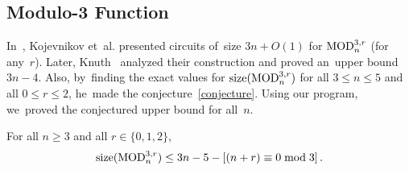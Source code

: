 \subsection{Modulo-3 Function}
In~\cite{DBLP:conf/sat/KojevnikovKY09}, Kojevnikov et~al.
presented circuits of~size $3n+O(1)$ for $\operatorname{MOD}_n^{3,r}$ (for any~$r$). Later,
Knuth~\cite[solution to exercise~$480$]{Knuth:2015:ACP:2898950} analyzed their construction and proved an~upper
bound $3n-4$. Also, by~finding the exact values
for $\operatorname{size}(\operatorname{MOD}_n^{3,r})$ for all $3 \le n \le 5$ and all $0 \le r \le 2$, he~made the conjecture~\eqref{conjecture}.
Using our program, we~proved the conjectured upper bound for all~$n$.

\begin{theorem}\label{theorem:mod3upper}
For all $n \ge 3$ and all $r \in \{0,1,2\}$,
\[\operatorname{size}(\operatorname{MOD}_n^{3,r}) \le 3n-5-[(n+r) \equiv 0\bmod 3] \,. \]
\end{theorem}


